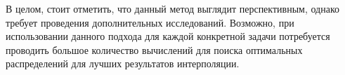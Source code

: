 В целом, стоит отметить, что данный метод выглядит перспективным, однако требует проведения дополнительных исследований. 
Возможно, при использовании данного подхода для каждой конкретной задачи потребуется 
проводить большое количество вычислений для поиска оптимальных распределений для лучших результатов интерполяции. 

